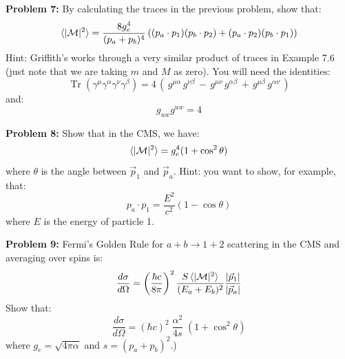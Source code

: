 \documentclass[12pt]{article}
\DeclareMathOperator{\Tr}{Tr}
\begin{document}
\noindent
{\bf Problem 7:} By calculating the traces in the previous problem, show that:
$$ \braket{|\mathcal{M}|^2} 
= \frac{8 g_e^4}{(p_a+p_b)^4}
\left((p_a\cdot p_1)(p_b\cdot p_2) + (p_a\cdot p_2)(p_b\cdot p_1)\right)
$$
Hint: Griffith's works through a very similar product of traces in Example 7.6 (just note that we are taking $m$ and $M$ as zero).  You will need the identities:
$$\Tr(\gamma^\mu \gamma^\alpha \gamma^\nu \gamma^\beta) 
= 4 \, 
(    \, g^{\mu\alpha}\,g^{\nu \beta}
\, - \, g^{\mu\nu}\,g^{\alpha \beta}
\, + \, g^{\mu\beta}\,g^{\alpha\nu} \, )$$
and:
$$g_{uw}g^{uw} = 4$$

\noindent
{\bf Problem 8:} Show that in the CMS, we have:
$$ \braket{|\mathcal{M}|^2} = g_e^4 (1 + \cos^2 \theta)$$
where $\theta$ is the angle between $\vec{p}_1$ and $\vec{p}_a$. 
Hint: you want to show, for example, that:
$$p_a\cdot p_1 = \frac{E^2}{c^2}(1 - \cos \theta)$$
where $E$ is the energy of particle 1.\\[5pt]

\newpage 

\noindent
{\bf Problem 9:} Fermi's Golden Rule for $a+b \to 1+2$ scattering in the CMS and averaging over spins is:
$$ \frac{d\sigma}{d\Omega} = \left( \frac{\hbar c}{8 \pi}\right)^2 \frac{S \braket{|\mathcal{M}|^2}
}{(E_a+E_b)^2}\frac{|\vec{p}_1|}{|\vec{p}_a|}$$
Show that:
$$\frac{d\sigma}{d\Omega} = (\hbar c)^2 \; \frac{\alpha^2}{4s} \; (1 + \cos^2 \theta)$$
where $g_e = \sqrt{4\pi\alpha}$ and $s = (p_a + p_b)^2$.)
\end{document}
